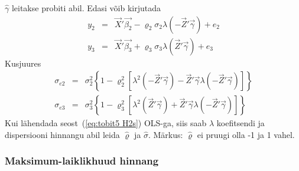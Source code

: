 \documentclass[a4paper]{article}
\numberwithin{equation}{subsection}
\begin{document}
$\hat\gamma$ leitakse probiti abil. Edasi võib kirjutada
\begin{eqnarray}
y_2 &=& \vec{X}'\vec{\beta_2} - \varrho_2\sigma_2 \lambda(
  -\vec{Z}'\vec{\gamma}) + e_2 \nonumber\\
y_3 &=& \vec{X}'\vec{\beta_3} + \varrho_3\sigma_3 \lambda(
  \vec{Z}'\vec{\gamma}) + e_3
\label{eq:tobit5 H2s}
\end{eqnarray}
Kusjuures
\begin{eqnarray}
\sigma_{e2} &=& \sigma_2^2 \left\{
  1 - \varrho_2^2 \left[
    \lambda^2( -\vec{Z}'\vec{\gamma}) -
    \vec{Z}'\vec{\gamma} \lambda( -\vec{Z}'\vec{\gamma}) \right]
  \right\} \nonumber\\
\sigma_{e3} &=& \sigma_3^2 \left\{
  1 - \varrho_3^2 \left[
    \lambda^2( \vec{Z}'\vec{\gamma}) +
    \vec{Z}'\vec{\gamma} \lambda( -\vec{Z}'\vec{\gamma}) \right] \right\}
\end{eqnarray}
Kui lähendada seost~(\ref{eq:tobit5 H2s}) OLS-ga, siis saab $\lambda$
koefitsendi ja dispersiooni hinnangu abil leida $\hat\varrho$ ja
$\hat\sigma$. Märkus: $\hat\varrho$ ei pruugi olla -1 ja 1 vahel.


\subsubsection{Maksimum-laiklikhuud hinnang}
\end{document}

